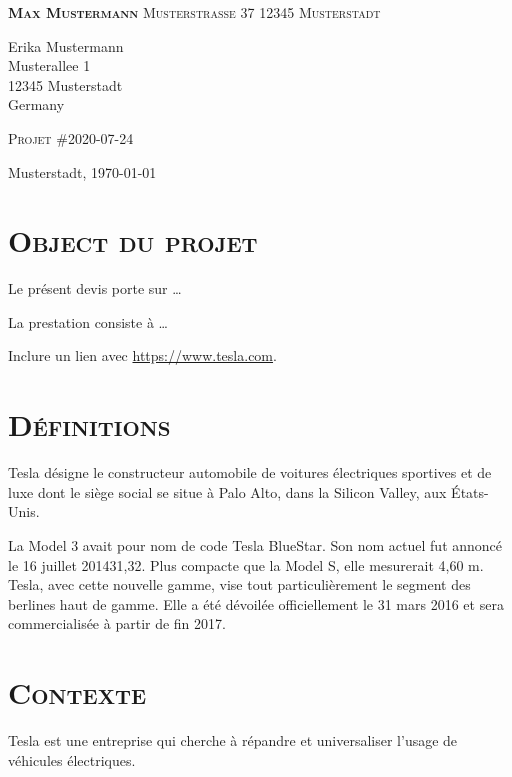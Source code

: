 \documentclass[10pt, a4paper]{article}
\begin{document}
\small
\ttfamily
\textsc{\textbf{Max Mustermann}}
\textbullet{} \textsc{Musterstraße 37}
\textbullet{} \textsc{12345 Musterstadt}

\vspace{1em}

\normalsize \ttfamily
Erika Mustermann\\
Musterallee 1\\
12345 Musterstadt\\
Germany\\

\vspace{6em}
\rmfamily

\huge{\textsc{Projet \#2020-07-24} }

\begin{flushright}
  \small
  Musterstadt, \today
\end{flushright}

\vspace{1em}

\normalsize \rmfamily

    \section*{\textsc{Object du projet}}
    Le présent devis porte sur \ldots{}

    La prestation consiste à \ldots{}

    Inclure un lien avec \url{https://www.tesla.com}.
    \section*{\textsc{Définitions}}
    Tesla désigne le constructeur automobile de voitures électriques
    sportives et de luxe dont le siège social se situe à Palo Alto, dans
    la Silicon Valley, aux États-Unis.

    La Model 3 avait pour nom de code Tesla BlueStar. Son nom actuel fut
    annoncé le 16 juillet 201431,32. Plus compacte que la Model S, elle
    mesurerait 4,60 m. Tesla, avec cette nouvelle gamme, vise tout
    particulièrement le segment des berlines haut de gamme. Elle a été
    dévoilée officiellement le 31 mars 2016 et sera commercialisée à
    partir de fin 2017.
    \section*{\textsc{Contexte}}
    Tesla est une entreprise qui cherche à répandre et universaliser
    l'usage de véhicules électriques.
\end{document}
